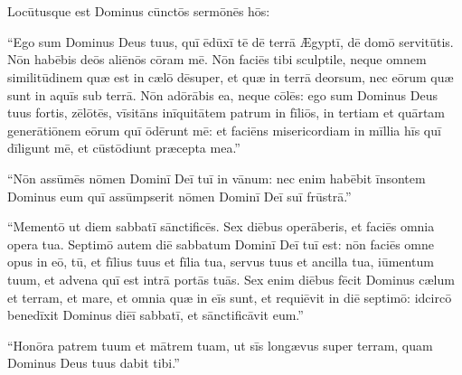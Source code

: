 \chapter{}


\thispagestyle{empty}

Locūtusque est Dominus cūnctōs sermōnēs hōs: 

``Ego sum Dominus Deus
tuus, quī ēdūxī tē dē terrā Ægyptī, dē domō servitūtis.  Nōn habēbis deōs
aliēnōs cōram mē. Nōn faciēs tibi sculptile, neque omnem
similitūdinem quæ est in cælō dēsuper, et
quæ in terrā deorsum, nec eōrum quæ sunt in aquīs sub terrā. 
Nōn adōrābis
ea, neque cōlēs: ego sum Dominus Deus tuus fortis,
zēlōtēs, vīsitāns
inīquitātem patrum in fīliōs, in tertiam et quārtam
generātiōnem eōrum quī ōdērunt mē:
et faciēns misericordiam in mīllia hīs quī dīligunt mē, et cūstōdiunt
præcepta mea.''

``Nōn assūmēs nōmen
Dominī Deī tuī in vānum: nec enim habēbit
īnsontem Dominus eum quī assūmpserit nōmen Dominī Deī suī
frūstrā.'' 

``Mementō ut diem sabbatī
sānctificēs. 
Sex diēbus operāberis, et
faciēs omnia opera tua. 
Septimō autem diē sabbatum Dominī Deī tuī est:
nōn faciēs omne opus in eō, tū, et fīlius tuus et fīlia tua, servus tuus et
ancilla tua, iūmentum tuum, et advena quī est intrā portās
tuās. 
Sex enim diēbus fēcit Dominus cælum et terram, et mare, et omnia
quæ in eīs sunt, et requiēvit in diē septimō: idcircō benedīxit Dominus diēī
sabbatī, et sānctificāvit eum.''

``Honōra patrem tuum et
mātrem tuam, ut sīs longævus super terram, quam Dominus
Deus tuus dabit tibi.''

